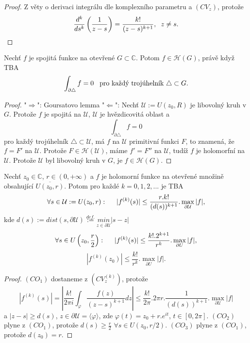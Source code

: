 \begin{proof}
Z věty o derivaci integrálu dle komplexního parametru a $(CV_z)$, protože 
\[\frac{d^k}{ds^k}\left(\frac{1}{z-s}\right)=
\frac{k!}{(z-s)^{k+1}},\hspace{2mm} z\neq{s}.\]
\end{proof}


\begin{theorem}[Morera]
Nechť $f$ je spojitá funkce na otevřené $G\subset{\mathbb{C}}$. Potom $f\in\mathcal{H}(G)$, právě když TBA
\[\int_{\partial\triangle}{f} =0 \hspace{3mm} \text{pro každý trojúhelník }\triangle\subset{G}.\]
\end{theorem}

\begin{proof}
"$\Rightarrow$": Goursatovo lemma\newline
"$\Leftarrow$": Nechť $\mathcal{U}:=U(z_0,R)$ je libovolný kruh v $G$. Protože $f$ je spojitá na $\mathcal{U}$, $\mathcal{U}$ je hvězdicovitá oblast a 
\[\int_{\partial\triangle}{f} =0\]
pro každý trojúhelník $\triangle\subset\mathcal{U}$, má $f$ na $\mathcal{U}$ primitivní funkci $F$, to znamená, že $f=F'$ na $\mathcal{U}$. Protože $F\in\mathcal{H}(\mathcal{U})$, máme $f'=F''$ na $\mathcal{U}$, tudíž $f$ je holomorfní na $\mathcal{U}$. Protože $\mathcal{U}$ byl libovolný kruh v $G$, je $f\in\mathcal{H}(G)$.
\end{proof}


\begin{theorem}
Nechť $z_0\in\mathbb{C}$, $r\in(0,+\infty)$ a $f$ je holomorní funkce na otevřené množině obsahující $\overline{U(z_0,r)}$. Potom pro každé $k=0,1,2,...$ je TBA
\[\forall{s\in{\mathcal{U}:=U(z_0,r)}}:\hspace{5mm}|f^{(k)}(s)|\leq\frac{r.k!}{(d(s))^{k+1}}.\max_{\partial\mathcal{U}}{|f|},\]
kde $d(s) := dist(s,\partial\mathcal{U})\overset{def.}{:=}\underset{{z\in{\partial{\mathcal{U}}}}}{min}{|s-z|}$
\[\forall{s\in{U\left(z_0,\frac{r}{2}\right)}}:\hspace{5mm}|f^{(k)}(s)|\leq\frac{k!.2^{k+1}}{r^k}.\max_{\partial{U}}{|f|},\]
\[|f^{(k)}(z_0)|\leq\frac{k!}{r^k}.\max_{\partial{U}}{|f|}.\]
\end{theorem}

\begin{proof}
$(CO_1)$ dostaneme z $(CV_z^{(k)})$, protože 
\[|f^{(k)}(s)|=
\left\lvert\frac{k!}{2\pi{i}}\int_\varphi{\frac{f(z)}{(z-s)^{k+1}}}dz\right\lvert\leq
\frac{k!}{2\pi}.2\pi{r}.\frac{1}{(d(s))^{k+1}}.\max_{\partial\mathcal{U}}{|f|}\]
a $|z-s|\geq d(s)$, $z\in\partial\mathcal{U}=\langle\varphi\rangle$, zde $\varphi(t)=z_0+r.e^{it}$, $t\in\left[0,2\pi\right]$.\newline
$(CO_2)$ plyne z $(CO_1)$, protože $d(s)\geq\frac{r}{2}$ $\forall{s\in{U(z_0,r/2)}}$.\newline
$(CO_3)$ plyne z $(CO_1)$, protože $d(z_0)=r$. 
\end{proof}

